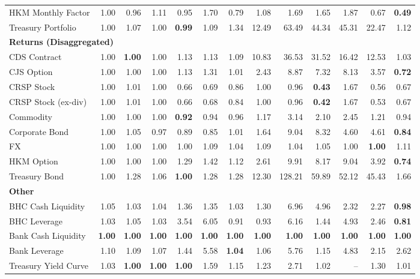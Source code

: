 \begin{table}[htbp]
\begin{tabular}{@{}lrrrrrrrrrrrr@{}}
HKM Monthly Factor & 1.00 & 0.96 & 1.11 & 0.95 & 1.70 & 0.79 & 1.08 & 1.69 & 1.65 & 1.87 & 0.67 & \textbf{0.49} \\
Treasury Portfolio & 1.00 & 1.07 & 1.00 & \textbf{0.99} & 1.09 & 1.34 & 12.49 & 63.49 & 44.34 & 45.31 & 22.47 & 1.12 \\
\midrule
\multicolumn{13}{l}{\textbf{Returns (Disaggregated)}} \\
CDS Contract & 1.00 & \textbf{1.00} & 1.00 & 1.13 & 1.13 & 1.09 & 10.83 & 36.53 & 31.52 & 16.42 & 12.53 & 1.03 \\
CJS Option & 1.00 & 1.00 & 1.00 & 1.13 & 1.31 & 1.01 & 2.43 & 8.87 & 7.32 & 8.13 & 3.57 & \textbf{0.72} \\
CRSP Stock & 1.00 & 1.01 & 1.00 & 0.66 & 0.69 & 0.86 & 1.00 & 0.96 & \textbf{0.43} & 1.67 & 0.56 & 0.67 \\
CRSP Stock (ex-div) & 1.00 & 1.01 & 1.00 & 0.66 & 0.68 & 0.84 & 1.00 & 0.96 & \textbf{0.42} & 1.67 & 0.53 & 0.67 \\
Commodity & 1.00 & 1.00 & 1.00 & \textbf{0.92} & 0.94 & 0.96 & 1.17 & 3.14 & 2.10 & 2.45 & 1.21 & 0.94 \\
Corporate Bond & 1.00 & 1.05 & 0.97 & 0.89 & 0.85 & 1.01 & 1.64 & 9.04 & 8.32 & 4.60 & 4.61 & \textbf{0.84} \\
FX & 1.00 & 1.00 & 1.00 & 1.00 & 1.09 & 1.04 & 1.09 & 1.04 & 1.05 & 1.00 & \textbf{1.00} & 1.11 \\
HKM Option & 1.00 & 1.00 & 1.00 & 1.29 & 1.42 & 1.12 & 2.61 & 9.91 & 8.17 & 9.04 & 3.92 & \textbf{0.74} \\
Treasury Bond & 1.00 & 1.28 & 1.06 & \textbf{1.00} & 1.28 & 1.28 & 12.30 & 128.21 & 59.89 & 52.12 & 45.43 & 1.66 \\
\midrule
\multicolumn{13}{l}{\textbf{Other}} \\
BHC Cash Liquidity & 1.05 & 1.03 & 1.04 & 1.36 & 1.35 & 1.03 & 1.30 & 6.96 & 4.96 & 2.32 & 2.27 & \textbf{0.98} \\
BHC Leverage & 1.03 & 1.05 & 1.03 & 3.54 & 6.05 & 0.91 & 0.93 & 6.16 & 1.44 & 4.93 & 2.46 & \textbf{0.81} \\
Bank Cash Liquidity & \textbf{1.00} & \textbf{1.00} & \textbf{1.00} & \textbf{1.00} & \textbf{1.00} & \textbf{1.00} & \textbf{1.00} & \textbf{1.00} & \textbf{1.00} & \textbf{1.00} & \textbf{1.00} & \textbf{1.00} \\
Bank Leverage & 1.10 & 1.09 & 1.07 & 1.44 & 5.58 & \textbf{1.04} & 1.06 & 5.76 & 1.15 & 4.83 & 2.15 & 2.62 \\
Treasury Yield Curve & 1.03 & \textbf{1.00} & \textbf{1.00} & \textbf{1.00} & 1.59 & 1.15 & 1.23 & 2.71 & 1.02 & -- & 1.30 & 1.01 \\
\bottomrule
\end{tabular}
\vspace{0.1cm}

\end{table}
